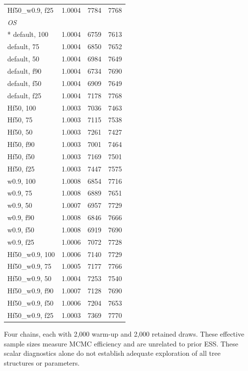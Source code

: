 \begin{longtable}{lrrr}
Hf50\_w0.9, f25 & 1.0004 & 7784 & 7768 \\
\multicolumn{4}{l}{\strut\textit{OS}}\\*
default, 100 & 1.0004 & 6759 & 7613 \\
default, 75 & 1.0004 & 6850 & 7652 \\
default, 50 & 1.0004 & 6984 & 7649 \\
default, f90 & 1.0004 & 6734 & 7690 \\
default, f50 & 1.0004 & 6909 & 7649 \\
default, f25 & 1.0004 & 7178 & 7768 \\
Hf50, 100 & 1.0003 & 7036 & 7463 \\
Hf50, 75 & 1.0003 & 7115 & 7538 \\
Hf50, 50 & 1.0003 & 7261 & 7427 \\
Hf50, f90 & 1.0003 & 7001 & 7464 \\
Hf50, f50 & 1.0003 & 7169 & 7501 \\
Hf50, f25 & 1.0003 & 7447 & 7575 \\
w0.9, 100 & 1.0008 & 6854 & 7716 \\
w0.9, 75 & 1.0008 & 6889 & 7651 \\
w0.9, 50 & 1.0007 & 6957 & 7729 \\
w0.9, f90 & 1.0008 & 6846 & 7666 \\
w0.9, f50 & 1.0008 & 6919 & 7690 \\
w0.9, f25 & 1.0006 & 7072 & 7728 \\
Hf50\_w0.9, 100 & 1.0006 & 7140 & 7729 \\
Hf50\_w0.9, 75 & 1.0005 & 7177 & 7766 \\
Hf50\_w0.9, 50 & 1.0004 & 7253 & 7540 \\
Hf50\_w0.9, f90 & 1.0007 & 7128 & 7690 \\
Hf50\_w0.9, f50 & 1.0006 & 7204 & 7653 \\
Hf50\_w0.9, f25 & 1.0003 & 7369 & 7770 \\
\end{longtable}
\noindent\begin{minipage}{\linewidth}\footnotesize Four chains, each with 2,000 warm-up and 2,000 retained draws. These effective sample sizes measure MCMC efficiency and are unrelated to prior ESS. These scalar diagnostics alone do not establish adequate exploration of all tree structures or parameters.\end{minipage}
\endgroup
